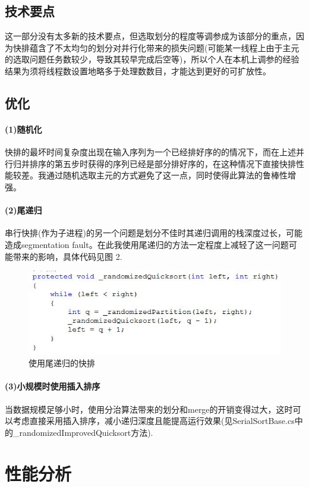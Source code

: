 \documentclass[UTF8]{article}
\begin{document}
\subsection{技术要点}
这一部分没有太多新的技术要点，但选取划分的程度等调参成为该部分的重点，因为快排蕴含了不太均匀的划分对并行化带来的损失问题(可能某一线程上由于主元的选取问题任务数较少，导致其较早完成后空等)，所以个人在本机上调参的经验结果为须将线程数设置地略多于处理数数目，才能达到更好的可扩放性。
\subsection{优化}
\paragraph{(1)随机化} 快排的最坏时间复杂度出现在输入序列为一个已经排好序的的情况下，而在上述并行归并排序的第五步时获得的序列已经是部分排好序的，在这种情况下直接快排性能较差。我通过随机选取主元的方式避免了这一点，同时使得此算法的鲁棒性增强。
\paragraph{(2)尾递归} 串行快排(作为子进程)的另一个问题是划分不佳时其递归调用的栈深度过长，可能造成segmentation fault。在此我使用尾递归的方法一定程度上减轻了这一问题可能带来的影响，具体代码见图 2.
\begin{figure}
	\includegraphics[width=1.0\textwidth]{tailRecursion.JPG}
	\caption{使用尾递归的快排}
	\label{tailRecursion}
\end{figure} 
\paragraph{(3)小规模时使用插入排序}当数据规模足够小时，使用分治算法带来的划分和merge的开销变得过大，这时可以考虑直接采用插入排序，减小递归深度且能提高运行效果(见SerialSortBase.cs中的\_randomizedImprovedQuicksort方法).
\section{性能分析}
\end{document}

